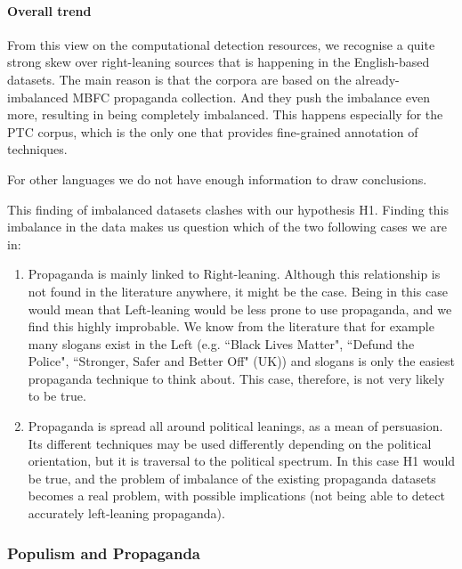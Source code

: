 \paragraph{Overall trend}
From this view on the computational detection resources, we recognise a quite strong skew over right-leaning sources that is happening in the English-based datasets.
The main reason is that the corpora are based on the already-imbalanced MBFC propaganda collection. And they push the imbalance even more, resulting in being completely imbalanced.
This happens especially for the PTC corpus, which is the only one that provides fine-grained annotation of techniques.

For other languages we do not have enough information to draw conclusions.

This finding of imbalanced datasets clashes with our hypothesis H1. Finding this imbalance in the data makes us question which of the two following cases we are in:

\begin{enumerate}
    \item Propaganda is mainly linked to Right-leaning. Although this relationship is not found in the literature anywhere, it might be the case. Being in this case would mean that Left-leaning would be less prone to use propaganda, and we find this highly improbable. We know from the literature that for example many slogans exist in the Left (e.g. ``Black Lives Matter", ``Defund the Police", ``Stronger, Safer and Better Off" (UK)) and slogans is only the easiest propaganda technique to think about. This case, therefore, is not very likely to be true.
    \item Propaganda is spread all around political leanings, as a mean of persuasion. Its different techniques may be used differently depending on the political orientation, but it is traversal to the political spectrum. In this case H1 would be true, and the problem of imbalance of the existing propaganda datasets becomes a real problem, with possible implications (not being able to detect accurately left-leaning propaganda).
\end{enumerate}


\subsubsection{\statusgreen Populism and Propaganda}
\label{ssec:ps_prop_leaning_imbalanced_concepts_populism_propaganda}

